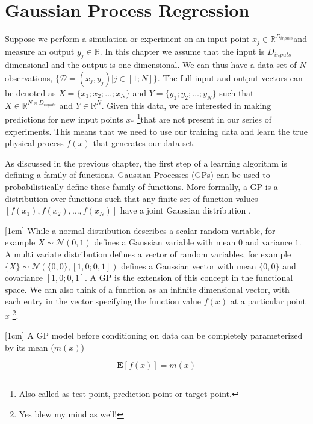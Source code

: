\chapter{Gaussian Process Regression}
\label{chapGp}

Suppose we perform a simulation or experiment on an input point $x_{j} \in \mathbb{R}^{D_{inputs}}$and measure an output $y_{j} \in \mathbb{R}$. In this chapter we assume that the input is $D_{inputs}$ dimensional and the output is one dimensional. We can thus have a data set of $N$ observations, $\{\mathcal{D} = (x_{j}, y_{j}) | j \in [1; N] \}$. The full input and output vectors can be denoted as $X = \{x_{1}; x_{2}; \ldots ; x_{N}\}$ and $Y = \{y_{1}; y_{2}; \ldots ; y_{N}\}$ such that $X \in \mathbb{R}^{N \times D_{inputs}}$ and $Y \in \mathbb{R}^{N }$. Given this data, we are interested in making predictions for new input points $x_{*}$ \footnote{Also called as test point, prediction point or target point.}that are not present in our series of experiments. This means that we need to use our training data and learn the true physical process  $f(x)$ that generates our data set.

As discussed in the previous chapter, the first step of a learning algorithm is defining a family of functions. Gaussian Processes (GPs) can be used to probabilistically define these family of functions. More formally, a GP is a distribution over functions such that any finite set of function values $[f(x_{1}), f(x_{2}), \ldots, f(x_{N})]$ have a joint Gaussian distribution \cite{rasmussen2006gaussian}. 

[1cm]
While a normal distribution describes a scalar random variable, for example $X \sim \mathcal{N}(0, 1)$ defines a Gaussian variable with mean $0$ and variance $1$. A multi variate distribution defines a vector of random variables, for example $\{X\} \sim \mathcal{N}(\{0, 0\}, [1, 0; 0, 1])$ defines a Gaussian vector with mean $\{0, 0\}$ and covariance $[1, 0; 0, 1]$. A GP is the extension of this concept in the functional space. We can also think of a function as an infinite dimensional vector, with each entry in the vector specifying the function value $f(x)$ at a particular point $x$ \footnote{Yes blew my mind as well!}. 

[1cm]
A GP model before conditioning on data can be completely parameterized by its mean ($m(x)$)

\begin{equation}\label{eq:meanGP}
\mathbf{E}[f(x)] = m(x)
\end{equation}

